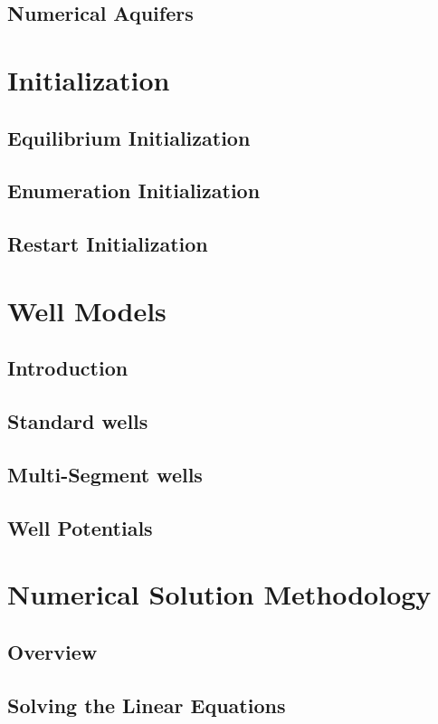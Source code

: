 \documentclass{elsarticle}
\begin{document}
\subsection{Numerical Aquifers}

\section{Initialization}
\subsection{Equilibrium Initialization}
\subsection{Enumeration Initialization}
\subsection{Restart Initialization}

\section{Well Models}
\subsection{Introduction}
\subsection{Standard wells}
\subsection{Multi-Segment wells}
\subsection{Well Potentials}

\section{Numerical Solution Methodology}
\subsection{Overview}
\subsection{Solving the Linear Equations}
\end{document}

